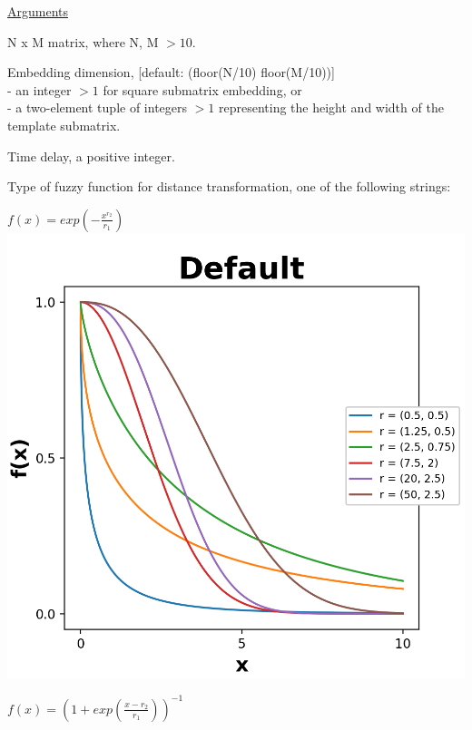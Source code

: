 \documentclass[12pt, a4paper, titlepage, openany]{book}
\begin{document}
\noindent \ul{Arguments}
\begin{description}[labelsep=1cm, labelwidth=2cm, nosep,,style=multiline,leftmargin=3cm]\footnotesize
\item[\texttt{Mat}]		N x M matrix,  where N, M $> 10$.
\item[\texttt{m}]		Embedding dimension, [default: (floor(N/10) floor(M/10))]\\
						- an integer $> 1$ for square submatrix embedding, or\\
						- a two-element tuple of integers $> 1$ representing the height and width of the template submatrix.
\item[\texttt{tau}]		Time delay, a positive integer.
\item[\texttt{Fx}]		Type of fuzzy function for distance transformation, one of the following strings:
	\begin{description}[labelsep=14em, labelwidth=10em, nosep,style=multiline,leftmargin=6cm]
	\item[\texttt{"default"}]	$f(x) = exp(-\frac{x^{r_2}}{r_1})$\\
		\includegraphics[scale=.5]{Fuzz2.png}
	\item[\texttt{"sigmoid"/"modsampen"}]	$f(x) = (1+exp(\frac{x-r_2}{r_1}))^{-1}$\\

\end{description}
\end{description}
\end{document}
